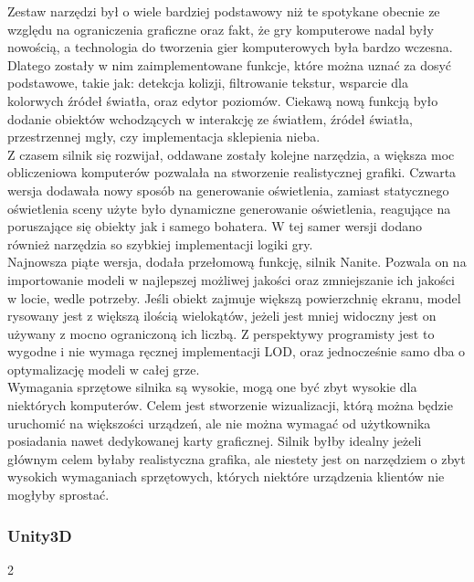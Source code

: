 \documentclass{article} %
\begin{document}
        Zestaw narzędzi był o wiele bardziej podstawowy niż te spotykane obecnie ze względu na ograniczenia graficzne oraz fakt, że gry komputerowe nadal były nowością, a technologia do tworzenia gier komputerowych była bardzo wczesna. Dlatego zostały w nim zaimplementowane funkcje, które można uznać za dosyć podstawowe, takie jak: detekcja kolizji, filtrowanie tekstur, wsparcie dla kolorwych źródeł światła, oraz edytor poziomów. Ciekawą nową funkcją było dodanie obiektów wchodzących w interakcję ze światłem, źródeł światła, przestrzennej mgły, czy implementacja sklepienia nieba.
        \\
        
        Z czasem silnik się rozwijał, oddawane zostały kolejne narzędzia, a większa moc obliczeniowa komputerów pozwalała na stworzenie realistycznej grafiki. Czwarta wersja dodawała nowy sposób na generowanie oświetlenia, zamiast statycznego oświetlenia sceny użyte było dynamiczne generowanie oświetlenia, reagujące na poruszające się obiekty jak i samego bohatera. W tej samer wersji dodano również narzędzia so szybkiej implementacji logiki gry.
        \\
        
        Najnowsza piąte wersja, dodała przełomową funkcję, silnik Nanite. Pozwala on na importowanie modeli w najlepszej możliwej jakości oraz zmniejszanie ich jakości w locie, wedle potrzeby. Jeśli obiekt zajmuje większą powierzchnię ekranu, model rysowany jest z większą ilością wielokątów, jeżeli jest mniej widoczny jest on używany z mocno ograniczoną ich liczbą. Z perspektywy programisty jest to wygodne i nie wymaga ręcznej implementacji LOD, oraz jednocześnie samo dba o optymalizację modeli w całej grze.
        \\
        
        Wymagania sprzętowe silnika są wysokie, mogą one być zbyt wysokie dla niektórych komputerów. Celem jest stworzenie wizualizacji, którą można będzie uruchomić na większości urządzeń, ale nie można wymagać od użytkownika posiadania nawet dedykowanej karty graficznej. Silnik byłby idealny jeżeli głównym celem byłaby realistyczna grafika, ale niestety jest on narzędziem o zbyt wysokich wymaganiach sprzętowych, których niektóre urządzenia klientów nie mogłyby sprostać.
        \\
        
        \subsubsection*{Unity3D}
        2
        \\
        
\end{document}

